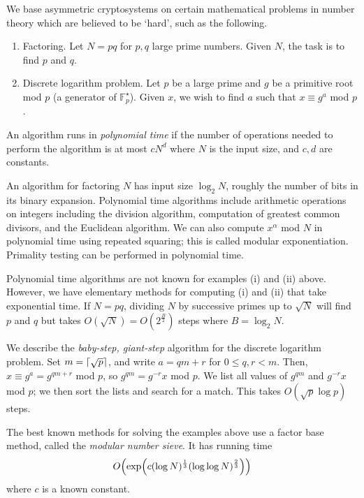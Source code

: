 We base asymmetric cryptosystems on certain mathematical problems in number theory which are believed to be `hard', such as the following.
\begin{enumerate}
    \item Factoring.
    Let \( N = pq \) for \( p, q \) large prime numbers.
    Given \( N \), the task is to find \( p \) and \( q \).
    \item Discrete logarithm problem.
    Let \( p \) be a large prime and \( g \) be a primitive root mod \( p \) (a generator of \( \mathbb F_p^\star \)).
    Given \( x \), we wish to find \( a \) such that \( x \equiv g^a \) mod \( p \).
\end{enumerate}
\begin{definition}
    An algorithm runs in \emph{polynomial time} if the number of operations needed to perform the algorithm is at most \( c N^d \) where \( N \) is the input size, and \( c, d \) are constants.
\end{definition}
\begin{example}
    An algorithm for factoring \( N \) has input size \( \log_2 N \), roughly the number of bits in its binary expansion.
    Polynomial time algorithms include arithmetic operations on integers including the division algorithm, computation of greatest common divisors, and the Euclidean algorithm.
    We can also compute \( x^\alpha \) mod \( N \) in polynomial time using repeated squaring; this is called modular exponentiation.
    Primality testing can be performed in polynomial time.

    Polynomial time algorithms are not known for examples (i) and (ii) above.
    However, we have elementary methods for computing (i) and (ii) that take exponential time.
    If \( N = pq \), dividing \( N \) by successive primes up to \( \sqrt{N} \) will find \( p \) and \( q \) but takes \( O(\sqrt{N}) = O(2^{\frac{B}{2}}) \) steps where \( B = \log_2 N \).

    We describe the \emph{baby-step, giant-step} algorithm for the discrete logarithm problem.
    Set \( m = \lceil\sqrt{p}\rceil \), and write \( a = qm + r \) for \( 0 \leq q, r < m \).
    Then, \( x \equiv g^a = g^{qm + r} \) mod \( p \), so \( g^{qm} = g^{-r} x \) mod \( p \).
    We list all values of \( g^{qm} \) and \( g^{-r}x \) mod \( p \); we then sort the lists and search for a match.
    This takes \( O(\sqrt{p}\log p) \) steps.

    The best known methods for solving the examples above use a factor base method, called the \emph{modular number sieve}.
    It has running time
    \[ O\qty(\exp(c (\log N)^{\frac{1}{3}} (\log \log N)^{\frac{2}{3}})) \]
    where \( c \) is a known constant.
\end{example}

